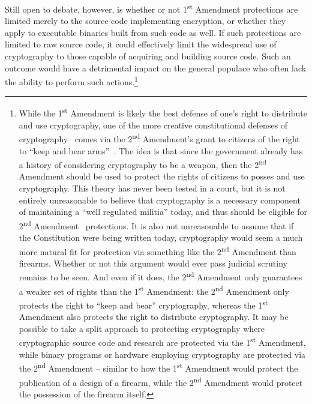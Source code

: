 Still open to debate, however, is whether or not 1\textsuperscript{st}
Amendment protections are limited merely to the source code
implementing encryption, or whether they apply to executable binaries
built from such code as well. If such protections are limited to raw
source code, it could effectively limit the widespread use of
cryptography to those capable of acquiring and building source
code. Such an outcome would have a detrimental impact on the general
populace who often lack the ability to perform such
actions.\footnote{While the 1\textsuperscript{st} Amendment is likely
  the best defense of one's right to distribute and use cryptography,
  one of the more creative constitutional defenses of
  cryptography~\cite{xkcd-504} comes via the 2\textsuperscript{nd}
  Amendment's grant to citizens of the right to ``keep and bear
  arms''~\cite{us-constitution-amend2}. The idea is that since the
  government already has a history of considering cryptography to be a
  weapon, then the 2\textsuperscript{nd} Amendment should be used to
  protect the rights of citizens to posses and use cryptography. This
  theory has never been tested in a court, but it is not entirely
  unreasonable to believe that cryptography is a necessary component
  of maintaining a ``well regulated militia'' today, and thus should
  be eligible for 2\textsuperscript{nd}
  Amendment~\cite{scotus-usvmiller-guns} protections. It is also not
  unreasonable to assume that if the Constitution were being written
  today, cryptography would seem a much more natural fit for
  protection via something like the 2\textsuperscript{nd} Amendment
  than firearms. Whether or not this argument would ever pass judicial
  scrutiny remains to be seen. And even if it does, the
  2\textsuperscript{nd} Amendment only guarantees a weaker set of
  rights than the 1\textsuperscript{st} Amendment: the
  2\textsuperscript{nd} Amendment only protects the right to ``keep
  and bear'' cryptography, whereas the 1\textsuperscript{st} Amendment
  also protects the right to distribute cryptography. It may be
  possible to take a split approach to protecting cryptography where
  cryptographic source code and research are protected via the
  1\textsuperscript{st} Amendment, while binary programs or hardware
  employing cryptography are protected via the 2\textsuperscript{nd}
  Amendment -- similar to how the 1\textsuperscript{st} Amendment
  would protect the publication of a design of a firearm, while the
  2\textsuperscript{nd} Amendment would protect the possession of the
  firearm itself.}

